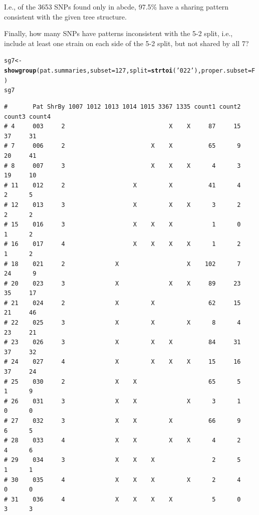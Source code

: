 \documentclass{article}\usepackage[]{graphicx}\usepackage[]{color}
\makeatletter
\newcommand{\hlnum}[1]{\textcolor[rgb]{0.686,0.059,0.569}{#1}}%
\newcommand{\hlstr}[1]{\textcolor[rgb]{0.192,0.494,0.8}{#1}}%
\newcommand{\hlstd}[1]{\textcolor[rgb]{0.345,0.345,0.345}{#1}}%
\newcommand{\hlkwb}[1]{\textcolor[rgb]{0.69,0.353,0.396}{#1}}%
\newcommand{\hlkwc}[1]{\textcolor[rgb]{0.333,0.667,0.333}{#1}}%
\newcommand{\hlkwd}[1]{\textcolor[rgb]{0.737,0.353,0.396}{\textbf{#1}}}%
\newenvironment{kframe}{%
 \def\at@end@of@kframe{}%
 \ifinner\ifhmode%
  \def\at@end@of@kframe{\end{minipage}}%
  \begin{minipage}{\columnwidth}%
 \fi\fi%
 \def\FrameCommand##1{\hskip\@totalleftmargin \hskip-\fboxsep
 \colorbox{shadecolor}{##1}\hskip-\fboxsep
     \hskip-\linewidth \hskip-\@totalleftmargin \hskip\columnwidth}%
 \MakeFramed {\advance\hsize-\width
   \@totalleftmargin\z@ \linewidth\hsize
   \@setminipage}}%
 {\par\unskip\endMakeFramed%
 \at@end@of@kframe}
\newenvironment{knitrout}{}{} %
\makeatother
\begin{document}
I.e., of the 3653 SNPs found only in abcde, 97.5\% have a sharing pattern consistent with the given tree structure.

Finally, how many SNPs have patterns inconsistent with the 5-2 split, i.e., include at least one strain on each side of the 5-2 split, but not shared by all 7?

\begin{knitrout}\footnotesize
{}\color{fgcolor}\begin{kframe}
\begin{alltt}
\hlstd{sg7} \hlkwb{<-} \hlkwd{showgroup}\hlstd{(pat.summaries,} \hlkwc{subset}\hlstd{=}\hlnum{127}\hlstd{,} \hlkwc{split}\hlstd{=}\hlkwd{strtoi}\hlstd{(}\hlstr{'022'}\hlstd{),} \hlkwc{proper.subset}\hlstd{=F)}
\hlstd{sg7}
\end{alltt}
\begin{verbatim}
#       Pat ShrBy 1007 1012 1013 1014 1015 3367 1335 count1 count2 count3 count4
# 4     003     2                             X    X     87     15     37     31
# 7     006     2                        X    X          65      9     20     41
# 8     007     3                        X    X    X      4      3     19     10
# 11    012     2                   X         X          41      4      2      5
# 12    013     3                   X         X    X      3      2      2      2
# 15    016     3                   X    X    X           1      0      1      2
# 16    017     4                   X    X    X    X      1      2      1      2
# 18    021     2              X                   X    102      7     24      9
# 20    023     3              X              X    X     89     23     35     17
# 21    024     2              X         X               62     15     21     46
# 22    025     3              X         X         X      8      4     23     21
# 23    026     3              X         X    X          84     31     37     32
# 24    027     4              X         X    X    X     15     16     37     24
# 25    030     2              X    X                    65      5      1      9
# 26    031     3              X    X              X      3      1      0      0
# 27    032     3              X    X         X          66      9      6      5
# 28    033     4              X    X         X    X      4      2      4      6
# 29    034     3              X    X    X                2      5      1      1
# 30    035     4              X    X    X         X      2      4      0      0
# 31    036     4              X    X    X    X           5      0      3      3

\end{verbatim}
\end{kframe}
\end{knitrout}
\end{document}
